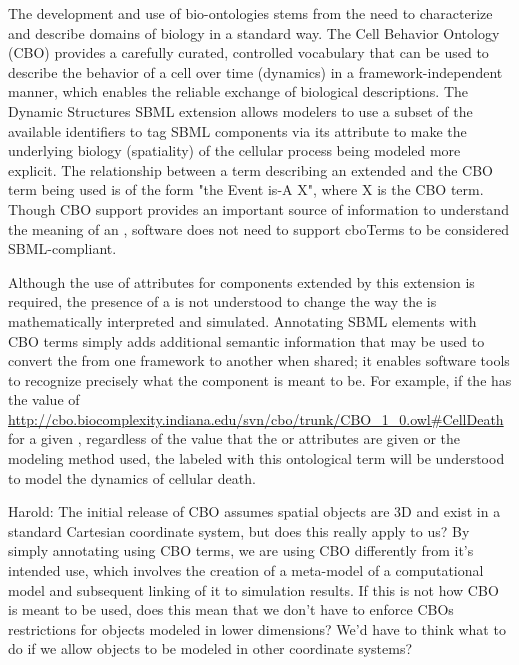 The development and use of bio-ontologies stems from the need to characterize and describe domains of biology in a standard way. The Cell Behavior Ontology (CBO) provides a carefully curated, controlled vocabulary that can be used to describe the behavior of a cell over time (dynamics) in a framework-independent manner, which enables the reliable exchange of biological descriptions. The Dynamic Structures SBML extension allows modelers to use a subset of the available identifiers to tag SBML \Event components via its attribute  to make the underlying biology (spatiality) of the cellular process being modeled more explicit. The relationship between a  term describing an extended \Event and the CBO term being used is of the form "the Event is-A X", where X is the CBO term. Though CBO support provides an important source of information to understand the meaning of an \Event, software does not need to support cboTerms to be considered SBML-compliant.

Although the use of  attributes for \Event components extended by this extension is required, the presence of a  is not understood to change the way the \Event is mathematically interpreted and simulated. Annotating SBML \Event elements with CBO terms simply adds additional semantic information that may be used to convert the \Event from one framework to another when shared; it enables software tools to recognize precisely what the component is meant to be. For example, if the  has the value of \url{http://cbo.biocomplexity.indiana.edu/svn/cbo/trunk/CBO_1_0.owl#CellDeath} for a given \Event, regardless of the value that the  or  attributes are given or the modeling method used, the \Event labeled with this ontological term will be understood to model the dynamics of cellular death.

{\color{red} Harold: \notice The initial release of CBO assumes spatial objects are 3D and exist in a standard Cartesian coordinate system, but does this really apply to us? By simply annotating using CBO terms, we are using CBO differently from it's intended use, which involves the creation of a meta-model of a computational model and subsequent linking of it to simulation results. If this is not how CBO is meant to be used, does this mean that we don't have to enforce CBOs restrictions for objects modeled in lower dimensions? We'd have to think what to do if we allow objects to be modeled in other coordinate systems?
}


